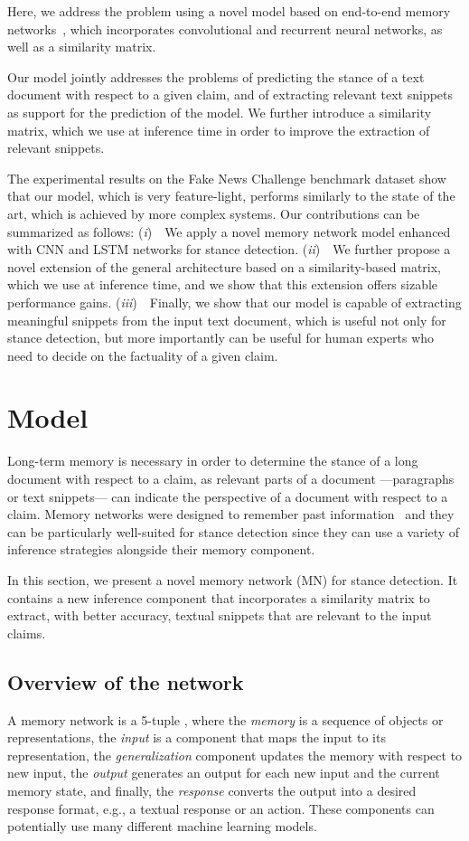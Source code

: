 \documentclass[11pt,a4paper]{article}
\newcommand{\Ni}{({\em i})~}
\newcommand{\Nii}{({\em ii})~}
\newcommand{\Niii}{({\em iii})~}
\begin{document}
Here, we address the problem using a novel model based on end-to-end memory networks~\cite{NIPS2015_5846}, which incorporates convolutional and recurrent neural networks, as well as a similarity matrix. 

\noindent Our model jointly addresses the problems of predicting the stance of a text document with respect to a given claim, and of extracting relevant text snippets as support for the prediction of the model. 
We further introduce a similarity matrix, which we use at inference time in order to improve the extraction of relevant snippets. 

The experimental results on the Fake News Challenge benchmark dataset show that our model, which is very feature-light, performs similarly to the state of the art, which is achieved by more complex systems.
Our contributions can be summarized as follows:
\Ni~We apply a novel memory network model enhanced with CNN and LSTM networks for stance detection.
\Nii~We further propose a novel extension of the general architecture based on a similarity-based matrix, which we use at inference time, and we show that this extension offers sizable performance gains.
\Niii~Finally, we show that our model is capable of extracting meaningful snippets from the input text document, which is useful not only for stance detection, but more importantly can be useful for human experts who need to decide on the factuality of a given claim. 

 
  

\section{Model}

\label{sec:memNN_stance}
Long-term memory is necessary 
in order to determine the stance of a long document with respect to a claim, as
relevant parts of a document ---paragraphs or text snippets--- can indicate the perspective of a document with respect to a claim.
Memory networks were designed to remember past information~\cite{NIPS2015_5846} and they can be particularly well-suited for stance detection since they can use a variety of inference strategies alongside their memory component. 

In this section, we present a novel memory network (MN) for stance detection. It contains a new inference component that incorporates a similarity matrix
to extract, with better accuracy, textual snippets 
that are relevant to the input claims.

\subsection{Overview of the network}
A memory network is a 
5-tuple , where the \emph{memory}  is a sequence of objects or representations, the \emph{input}  is a component that maps the input to its representation, the \emph{generalization} component  \cite{NIPS2015_5846} updates the memory with respect to new input, the \emph{output}  generates an output for each new input and the current memory state, and finally, the \emph{response}  converts the output into a desired response format, e.g., a textual response or an action. These components can potentially use many different machine learning models.
\end{document}

